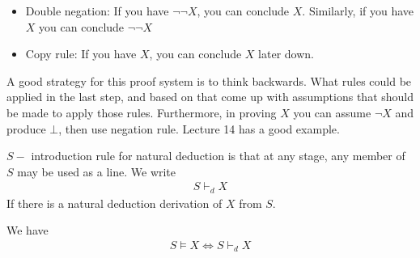 \documentclass[a4paper]{article}
\theoremstyle{plain}
\newtheorem{thm}{Theorem}[section]
\theoremstyle{definition}
\newtheorem{defn}{Definition}[section]
\theoremstyle{remark}
\begin{document}
\begin{tcolorbox}[colback=black!3!white,colframe=black!60!white,title=\begin{defn}Natural Deduction \label{Natural Deduction}\end{defn}]
\begin{itemize}
	\item Double negation: If you have $\neg \neg X$, you can conclude $X$. Similarly, if you have $X$ you can conclude $\neg \neg X$
	\item Copy rule: If you have $X $, you can conclude $X$ later down.
\end{itemize}
A good strategy for this proof system is to think backwards. What rules could be applied in the last step, and based on that come up with assumptions that should be made to apply those rules. Furthermore, in proving $X$ you can assume $\neg X$ and produce $\bot$, then use negation rule. Lecture 14 has a good example.
\end{tcolorbox}
\begin{tcolorbox}[colback=black!3!white,colframe=black!60!white,title=\begin{defn}S Introduction \label{S Introduction}\end{defn}]
$S-$ introduction rule for natural deduction is that at any stage, any member of $S$ may be used as a line. We write
\begin{align}
S \vdash_d X
\end{align}
If there is a natural deduction derivation of $X$ from $S$.
\end{tcolorbox}
\begin{tcolorbox}[colback=black!3!white,colframe=black!60!white,title=\begin{thm}Soundness and Completeness \label{Soundness and Completeness}\end{thm}]
	We have
		\begin{align}
	S \vDash X \iff S \vdash_d X	
		\end{align}
\end{tcolorbox}
\end{document}
